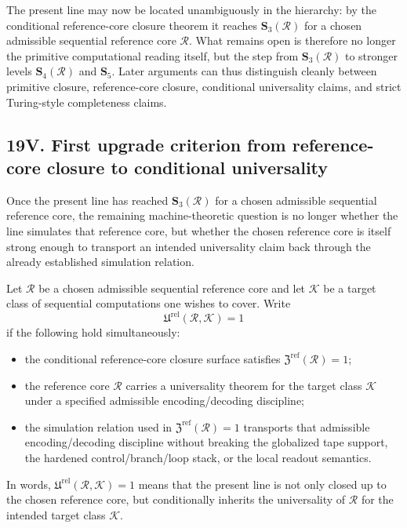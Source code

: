 \begin{corollary}
The present line may now be located unambiguously in the hierarchy: by the conditional reference-core closure theorem it reaches $\mathbf S_3(\mathcal R)$ for a chosen admissible sequential reference core $\mathcal R$. What remains open is therefore no longer the primitive computational reading itself, but the step from $\mathbf S_3(\mathcal R)$ to stronger levels $\mathbf S_4(\mathcal R)$ and $\mathbf S_5$. Later arguments can thus distinguish cleanly between primitive closure, reference-core closure, conditional universality claims, and strict Turing-style completeness claims.
\end{corollary}


\subsection*{19V. First upgrade criterion from reference-core closure to conditional universality}
Once the present line has reached \(\mathbf S_3(\mathcal R)\) for a chosen admissible sequential reference core, the remaining machine-theoretic question is no longer whether the line simulates that reference core, but whether the chosen reference core is itself strong enough to transport an intended universality claim back through the already established simulation relation.

\begin{definition}
Let \(\mathcal R\) be a chosen admissible sequential reference core and let \(\mathcal K\) be a target class of sequential computations one wishes to cover. Write
\[
\mathfrak U^{\mathrm{rel}}(\mathcal R,\mathcal K)=1
\]
if the following hold simultaneously:
\begin{itemize}[leftmargin=2em]
 \item the conditional reference-core closure surface satisfies \(\mathfrak Z^{\mathrm{ref}}(\mathcal R)=1\);
 \item the reference core \(\mathcal R\) carries a universality theorem for the target class \(\mathcal K\) under a specified admissible encoding/decoding discipline;
 \item the simulation relation used in \(\mathfrak Z^{\mathrm{ref}}(\mathcal R)=1\) transports that admissible encoding/decoding discipline without breaking the globalized tape support, the hardened control/branch/loop stack, or the local readout semantics.
\end{itemize}
In words, \(\mathfrak U^{\mathrm{rel}}(\mathcal R,\mathcal K)=1\) means that the present line is not only closed up to the chosen reference core, but conditionally inherits the universality of \(\mathcal R\) for the intended target class \(\mathcal K\).
\end{definition}

